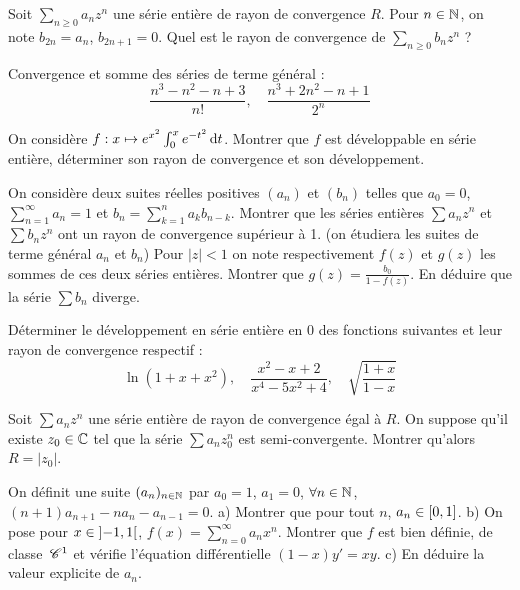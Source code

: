 \begin{exercice}
Soit $\sum_{n\ge 0}a_{n}z^{n}$ une série entière de rayon de convergence $R$. 
Pour $n\in\mathbb{N}$, on note $b_{2n}=a_{n}$, $b_{2n+1}=0$. 
Quel est le rayon de convergence de $\sum_{n\ge 0}b_{n}z^{n}$ ? 
\end{exercice}

\begin{exercice}
Convergence et somme des séries de terme général : 
$$ \frac{n^{3}-n^{2}-n+3}{n!}, \quad \frac{n^{3}+2n^{2}-n+1}{2^{n}} $$ 
\end{exercice}

\begin{exercice}
On considère $f:x\mapsto e^{x^{2}}\int_{0}^{x}e^{-t^{2}}\,\mathrm{d}t$. 
Montrer que $f$ est développable en série entière, déterminer son rayon de convergence et son développement. 
\end{exercice}

\begin{exercice}
On considère deux suites réelles positives $(a_{n})$ et $(b_{n})$ telles que $a_{0}=0$, $\sum_{n=1}^{\infty}a_{n}=1$ et $b_{n}=\sum_{k=1}^{n}a_{k}b_{n-k}$. 
Montrer que les séries entières $\sum a_{n}z^{n}$ et $\sum b_{n}z^{n}$ ont un rayon de convergence supérieur à 1. (on étudiera les suites de terme général $a_{n}$ et $b_{n}$) 
Pour $|z|<1$ on note respectivement $f(z)$ et $g(z)$ les sommes de ces deux séries entières. 
Montrer que $g(z)=\frac{b_{0}}{1-f(z)}$. 
En déduire que la série $\sum b_{n}$ diverge. 
\end{exercice}

\begin{exercice}
Déterminer le développement en série entière en 0 des fonctions suivantes et leur rayon de convergence respectif : 
$$ \ln(1+x+x^2), \quad \frac{x^2-x+2}{x^4-5x^2+4}, \quad \sqrt{\frac{1+x}{1-x}} $$ 
\end{exercice}

\begin{exercice}
Soit $\sum a_{n}z^{n}$ une série entière de rayon de convergence égal à $R$. 
On suppose qu'il existe $z_{0}\in\mathbb{C}$ tel que la série $\sum a_{n}z_{0}^{n}$ est semi-convergente. Montrer qu'alors $R=|z_{0}|$. 
\end{exercice}

\begin{exercice}
On définit une suite $(a_{n})_{n\in\mathbb{N}}$ par $a_{0}=1$, $a_{1}=0$, $\forall n\in\mathbb{N}$, $(n+1)a_{n+1}-na_{n}-a_{n-1}=0$. 
a) Montrer que pour tout $n$, $a_{n}\in\left[0, 1\right]$. 
b) On pose pour $x\in\left]-1, 1\right[$, $f(x)=\sum_{n=0}^{\infty}a_{n}x^{n}$. 
Montrer que $f$ est bien définie, de classe $\,\mathscr C^{1}$ et vérifie l'équation différentielle $(1-x)y'=xy$. 
c) En déduire la valeur explicite de $a_{n}$. 
\end{exercice}

